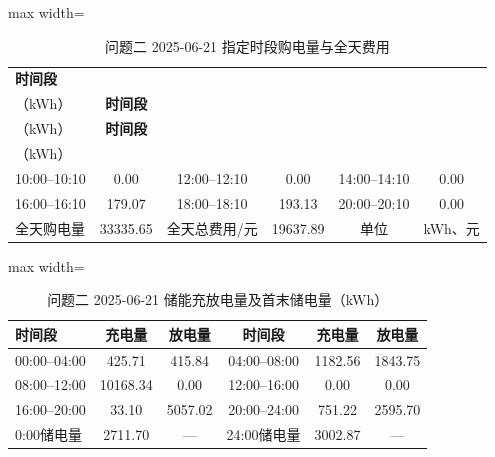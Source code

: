 \documentclass[UTF8,a4paper,zihao=-4,fontset=windows]{ctexart}
\begin{document}
\begin{table}[H]\centering
\fontsize{9.5}{12}\selectfont\setlength{\tabcolsep}{4pt}\renewcommand{\arraystretch}{1.12}
\begin{adjustbox}{max width=\linewidth}\begin{tabular}{lccccc}\toprule
\textbf{时间段} & \shortstack{\textbf{购电量}\\{\normalfont （kWh）}} & \textbf{时间段} & \shortstack{\textbf{购电量}\\{\normalfont （kWh）}} & \textbf{时间段} & \shortstack{\textbf{购电量}\\{\normalfont （kWh）}}\\\midrule
10:00–10:10 & 0.00 & 12:00–12:10 & 0.00 & 14:00–14:10 & 0.00\\
16:00–16:10 & 179.07 & 18:00–18:10 & 193.13 & 20:00–20:10 & 0.00\\
全天购电量 & 33335.65 & 全天总费用/元 & 19637.89 & 单位 & kWh、元\\
\bottomrule\end{tabular}\end{adjustbox}
\caption{问题二 2025-06-21 指定时段购电量与全天费用}
\end{table}
\begin{table}[H]\centering
\fontsize{9.5}{12}\selectfont\setlength{\tabcolsep}{4pt}\renewcommand{\arraystretch}{1.12}
\begin{adjustbox}{max width=\linewidth}\begin{tabular}{lccccc}\toprule
\textbf{时间段} & \textbf{充电量} & \textbf{放电量} & \textbf{时间段} & \textbf{充电量} & \textbf{放电量}\\\midrule
00:00–04:00 & 425.71 & 415.84 & 04:00–08:00 & 1182.56 & 1843.75\\
08:00–12:00 & 10168.34 & 0.00 & 12:00–16:00 & 0.00 & 0.00\\
16:00–20:00 & 33.10 & 5057.02 & 20:00–24:00 & 751.22 & 2595.70\\
0:00储电量 & 2711.70 & — & 24:00储电量 & 3002.87 & —\\
\bottomrule\end{tabular}\end{adjustbox}
\caption{问题二 2025-06-21 储能充放电量及首末储电量（kWh）}
\end{table}
\end{document}

